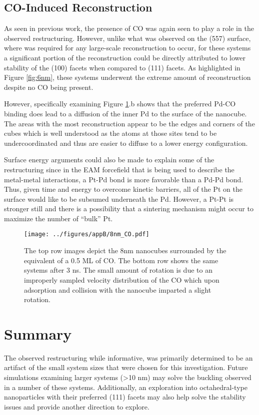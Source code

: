 \subsection{CO-Induced Reconstruction}
As seen in previous work\citep{Michalka:2013aa}, the presence of CO was again
seen to play a role in the observed restructuring. However, unlike what was
observed on the  (557) surface, where  was
required for any large-scale reconstruction to occur, for these systems a
significant portion of the reconstruction could be directly attributed to lower
stability of the (100) facets when compared to (111) facets. As highlighted in
Figure \ref{fig:6nm}, these systems underwent the extreme amount of
reconstruction despite no CO being present. 

However, specifically examining Figure \ref{fig:8nmCO}.b shows that the
preferred Pd-CO binding does lead to a diffusion of the inner Pd to the surface
of the nanocube. The areas with the most reconstruction appear to be the edges
and corners of the cubes which is well understood as the atoms at those sites
tend to be undercoordinated and thus are easier to diffuse to a lower energy
configuration. 

Surface energy arguments could also be made to explain some of the
restructuring since in the EAM forcefield that is being used to describe the
metal-metal interactions, a Pt-Pd bond is more favorable than a Pd-Pd bond.
Thus, given time and energy to overcome kinetic barriers, all of the Pt on the
surface would like to be subsumed underneath the Pd. However, a Pt-Pt is
stronger still and there is a possibility that a sintering mechanism might
occur to maximize the number of ``bulk'' Pt.


\begin{landscape}
\begin{figure}[p!]
\centering
  \texttt{[image: ../figures/appB/8nm\_CO.pdf]}
  \caption{The top row images depict the 8nm nanocubes surrounded by the
equivalent of a 0.5 ML of CO. The bottom row shows the same systems after 3 ns.
The small amount of rotation is due to an improperly sampled velocity
distribution of the CO which upon adsorption and collision with the nanocube
imparted a slight rotation.}
  \label{fig:8nmCO}
\end{figure}
\end{landscape}



\section{Summary}
The observed restructuring while informative, was primarily determined to be an
artifact of the small system sizes that were chosen for this investigation.
Future simulations examining larger systems (>10 nm) may solve the buckling
observed in a number of these systems. Additionally, an exploration into
octahedral-type nanoparticles with their preferred (111) facets may also help
solve the stability issues and provide another direction to explore.
